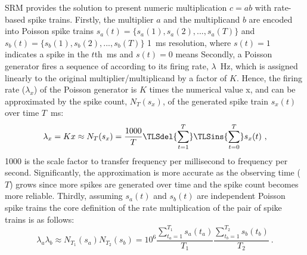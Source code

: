 SRM provides the solution to present numeric multiplication $c=ab$ with rate-based spike trains.
Firstly, the multiplier $a$ and the multiplicand $b$ are encoded into Poisson spike trains $s_a(t)=\{s_a(1),s_a(2),...,s_a(T)\}$ and $s_b(t)=\{s_b(1),s_b(2),...,s_b(T)\}$ \protect{} \protect{} 1~ms resolution, where $s(t)=1$ indicates a spike in the $t$th~ms and $s(t)=0$ means \protect{} \protect{}
Secondly, a Poisson generator fires a sequence of \protect{} \protect{} according to its firing rate, $\lambda$~Hz, which is assigned linearly to the original multiplier/multiplicand by a factor of $K$.
Hence, the firing rate ($\lambda_x$) of the Poisson generator is $K$ times the numerical value x, and can be approximated by the \protect{} \protect{} spike count, $N_T(s_x)$, of the generated spike train $s_x(t)$ over time \protect{} $T$~ms:
\begin{equation}
\lambda_x = Kx \approx N_T(s_x) = \frac{1000}{T} \protect\TLSdel{\sum_{t=1}^{T}} \protect\TLSins{\sum_{t=0}^{T}} s_x(t)~,
\end{equation} 
1000 is the scale factor to transfer frequency per millisecond to frequency per second.
Significantly, the approximation is more accurate as the observing time ($T$) grows since more spikes are generated over time and the \protect{} \protect{} spike count becomes more reliable.
Thirdly, assuming $s_a(t)$ and $s_b(t)$ are independent Poisson spike trains the core definition of the rate multiplication of the pair of spike trains is as follows:
\begin{equation}
\lambda_a \lambda_b \approx N_{T_1}(s_a)N_{T_2}(s_b)= 10^6 \frac{\sum_{t_a=1}^{T_1}s_a(t_a)}{T_1}  \frac{\sum_{t_b=1}^{T_2} s_b(t_b)}{T_2}~.
\label{equ:mul}
\end{equation} 

